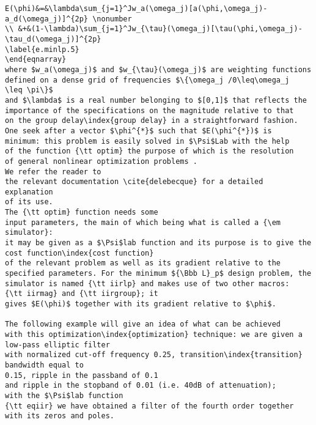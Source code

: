 {\begin{verbatim}
E(\phi)&=&\lambda\sum_{j=1}^Jw_a(\omega_j)[a(\phi,\omega_j)-a_d(\omega_j)]^{2p} \nonumber
\\ &+&(1-\lambda)\sum_{j=1}^Jw_{\tau}(\omega_j)[\tau(\phi,\omega_j)-
\tau_d(\omega_j)]^{2p}
\label{e.minlp.5}
\end{eqnarray}
where $w_a(\omega_j)$ and $w_{\tau}(\omega_j)$ are weighting functions 
defined on a dense grid of frequencies $\{\omega_j /0\leq\omega_j 
\leq \pi\}$
and $\lambda$ is a real number belonging to $[0,1]$ that reflects the 
importance of the specifications on the magnitude relative to that 
on the group delay\index{group delay} in a straightforward fashion.
One seek after a vector $\phi^{*}$ such that $E(\phi^{*})$ is 
minimum: this problem is easily solved in $\Psi$Lab with the help 
of the function {\tt optim} the purpose of which is the resolution 
of general nonlinear optimization problems . 
We refer the reader to
the relevant documentation \cite{delebecque} for a detailed explanation 
of its use.
The {\tt optim} function needs some 
input parameters, the main of which being what is called a {\em simulator}: 
it may be given as a $\Psi$lab function and its purpose is to give the cost function\index{cost function} 
of the relevant problem as well as its gradient relative to the 
specified parameters. For the minimum ${\Bbb L}_p$ design problem, the 
simulator is named {\tt iirlp} and makes use of two other macros: 
{\tt iirmag} and {\tt iirgroup}; it 
gives $E(\phi)$ together with its gradient relative to $\phi$.

The following example will give an idea of what can be achieved 
with this optimization\index{optimization} technique: we are given a low-pass elliptic filter 
with normalized cut-off frequency 0.25, transition\index{transition} 
bandwidth equal to
0.15, ripple in the passband of 0.1 
and ripple in the stopband of 0.01 (i.e. 40dB of attenuation); 
with the $\Psi$lab function 
{\tt eqiir} we have obtained a filter of the fourth order together 
with its zeros and poles. 


\end{verbatim}}
